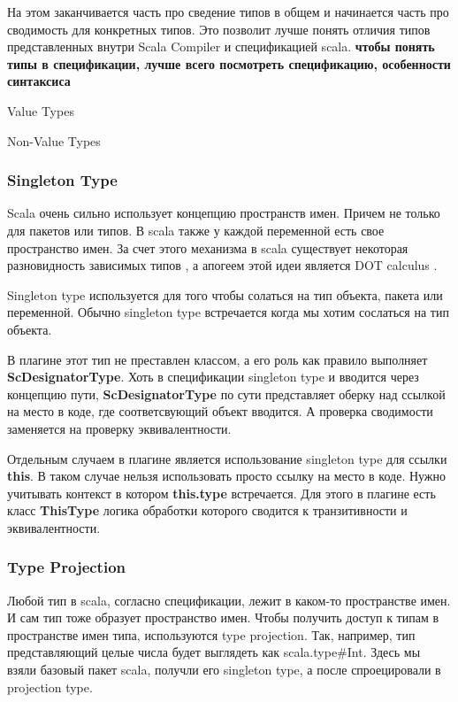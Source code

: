На этом заканчивается часть про сведение типов в общем и начинается часть про
сводимость для конкретных типов.
Это позволит лучше понять отличия типов представленных внутри Scala Compiler
и спецификацией scala.
\textbf{чтобы понять типы в спецификации, лучше всего посмотреть спецификацию,
особенности синтаксиса}

Value Types

Non-Value Types

\subsubsection{Singleton Type}
Scala очень сильно использует концепцию пространств имен.
Причем не только для пакетов или типов.
В scala также у каждой переменной есть свое пространство имен.
За счет этого механизма в scala существует некоторая разновидность зависимых
типов \cite{dependent_type}, а апогеем этой идеи является DOT calculus
\cite{dot_calculus}.

Singleton type используется для того чтобы солаться на тип объекта, пакета или
переменной.
Обычно singleton type встречается когда мы хотим сослаться на тип объекта.

В плагине этот тип не преставлен классом, а его роль как правило выполняет
\textbf{ScDesignatorType}.
Хоть в спецификации singleton type и вводится через концепцию пути,
\textbf{ScDesignatorType} по сути представляет оберку над ссылкой на место в коде,
где соответсвующий объект вводится.
А проверка сводимости заменяется на проверку эквивалентности.

Отдельным случаем в плагине является использование singleton type для ссылки
\textbf{this}.
В таком случае нельзя использовать просто ссылку на место в коде.
Нужно учитывать контекст в котором \textbf{this.type} встречается.
Для этого в плагине есть класс \textbf{ThisType} логика обработки которого
сводится к транзитивности и эквивалентности.


\subsubsection{Type Projection}

Любой тип в scala, согласно спецификации, лежит в каком-то пространстве имен.
И сам тип тоже образует пространство имен.
Чтобы получить доступ к типам в пространстве имен типа, используются
type projection.
Так, например, тип представляющий целые числа будет выглядеть как
scala.type\#Int.
Здесь мы взяли базовый пакет scala, получли его singleton type, а после
спроецировали в projection type.

